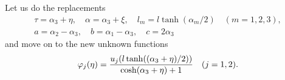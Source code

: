 Let us do the replacements
\begin{equation} \label{Ostryk_Eq_7_}
\begin{array}{c}
	\tau =\alpha _{3} +\eta , \quad    \alpha =\alpha _{3} +\xi , \quad   l_{m} =l\tanh ({\alpha _{m}/2} ) \quad  (m=1,2,3),
	\\
	a=\alpha _{2} -\alpha _{3} , \quad    b=\alpha _{1} -\alpha _{3} ,  \quad  c=2\alpha _{3}  
\end{array}
\end{equation} 
and move on to the new unknown functions
\begin{equation} \label{Ostryk_Eq_8_} 
\varphi _{j} (\eta )=\dfrac{u_{j} (l\tanh ({(\alpha _{3} +\eta )\mathord{\left/ {\vphantom {(\alpha _{3} +\eta ) 2}} \right. \kern-\nulldelimiterspace} 2} ))}{\cosh (\alpha _{3} +\eta )+1}  \quad (j=1,2).  
\end{equation} 

